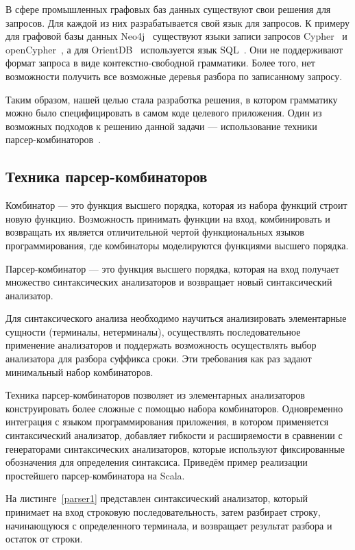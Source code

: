 В сфере промышленных графовых баз данных существуют свои решения для запросов. Для каждой из них разрабатывается свой язык для запросов. К примеру для графовой базы данных Neo4j~\cite{Neo4j} существуют языки записи запросов Cypher~\cite{Cypher} и openCypher~\cite{openCypher}, а для OrientDB~\cite{OrientDB} используется язык SQL~\cite{Sql}. Они не поддерживают формат запроса в виде контекстно-свободной грамматики. Более того, нет возможности получить все возможные деревья разбора по записанному запросу.

 Таким образом, нашей целью стала разработка решения, в котором грамматику можно было специфицировать в самом коде целевого приложения. Один из возможных подходов к решению данной задачи — использование техники парсер-комбинаторов~\cite{HOFunParsing}.

\subsection{Техника парсер-комбинаторов}
Комбинатор — это функция высшего порядка, которая из набора функций строит новую функцию. Возможность принимать функции на вход, комбинировать и возвращать их является отличительной чертой функциональных языков программирования, где комбинаторы моделируются функциями высшего порядка.

Парсер-комбинатор — это функция высшего порядка, которая на вход получает множество синтаксических анализаторов и возвращает новый синтаксический анализатор. 

Для синтаксического анализа необходимо научиться анализировать элементарные сущности (терминалы, нетерминалы), осуществлять последовательное применение анализаторов и поддержать возможность осуществлять выбор анализатора для разбора суффикса сроки. Эти требования как раз задают минимальный набор комбинаторов.

Техника парсер-комбинаторов позволяет из элементарных анализаторов конструировать более сложные с помощью набора комбинаторов. Одновременно интеграция с языком программирования приложения, в котором применяется синтаксический анализатор, добавляет гибкости и расширяемости в сравнении с генераторами синтаксических анализаторов, которые используют фиксированные обозначения для определения синтаксиса. Приведём пример реализации простейшего парсер-комбинатора на Scala.

На листинге~\ref{parser1} представлен синтаксический анализатор, который принимает на вход строковую последовательность, затем разбирает строку, начинающуюся с определенного терминала, и возвращает результат разбора и остаток от строки.


